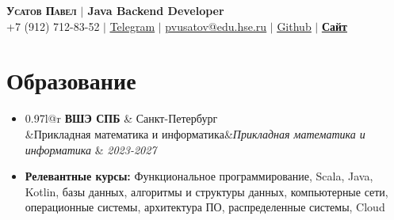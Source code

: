 \documentclass[letterpaper,10pt]{article}
\makeatletter
\newcommand{\resumeSubheading}[4]{
	\vspace{-1pt}\item
	\begin{tabular*}{0.97\textwidth}{l@{\extracolsep{\fill}}r}
		\textbf{#1} & #2 \\
		\ifx&#3&\else\textit{\small#3} & \textit{\small #4} \\ \fi
	\end{tabular*}\vspace{-5pt}
}
\newcommand{\resumeSubHeadingListStart}{\begin{itemize}[leftmargin=0.15in, label={}]}
\newcommand{\resumeSubHeadingListEnd}{\end{itemize}}
\newcommand{\ulhref}[2]{\href{#1}{\underline{#2}}}
\makeatother
\begin{document}
	
	
	\begin{center}
		\textbf{\Large \scshape Усатов Павел} \textbf{\Large $|$ Java Backend Developer} \\ \vspace{1pt}
		\small +7 (912) 712-83-52 $|$ 
		\href{https://t.me/Usatov_Pavel}{\underline{Telegram}} $|$
		\href{mailto:pvusatov@edu.hse.ru}{\underline{pvusatov@edu.hse.ru}} $|$
		\href{https://github.com/UsatovPavel}{\underline{Github}} $|$
        \href{https://usatovpavel.ru}{\underline{\textbf{Сайт}}}
	\end{center}
	
	
	\section{Образование}
	\resumeSubHeadingListStart
	\resumeSubheading
	{ВШЭ СПБ}{Санкт-Петербург}
	{Прикладная математика и информатика}{2023-2027}
	\item \textbf{Релевантные курсы:}
	Функциональное программирование, Scala, Java, Kotlin, базы данных,
	алгоритмы и структуры данных, компьютерные сети, операционные системы, архитектура ПО, распределенные системы, Cloud
	\resumeSubHeadingListEnd
	
	
\end{document}
